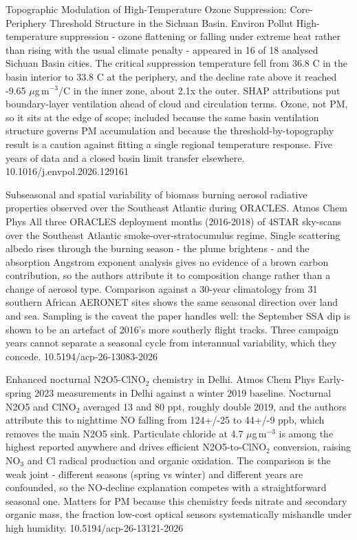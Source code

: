 \documentclass[10pt]{article}
\begin{document}
{Topographic Modulation of High-Temperature Ozone Suppression: Core-Periphery Threshold Structure in the Sichuan Basin.}
{Environ Pollut}
{High-temperature suppression - ozone flattening or falling under extreme heat rather than rising with the usual climate penalty - appeared in 16 of 18 analysed Sichuan Basin cities. The critical suppression temperature fell from 36.8 C in the basin interior to 33.8 C at the periphery, and the decline rate above it reached -9.65 $\mu$g\,m$^{-3}$/C in the inner zone, about 2.1x the outer. SHAP attributions put boundary-layer ventilation ahead of cloud and circulation terms. Ozone, not PM, so it sits at the edge of scope; included because the same basin ventilation structure governs PM accumulation and because the threshold-by-topography result is a caution against fitting a single regional temperature response. Five years of data and a closed basin limit transfer elsewhere.}
{10.1016/j.envpol.2026.129161}

{Subseasonal and spatial variability of biomass burning aerosol radiative properties observed over the Southeast Atlantic during ORACLES.}
{Atmos Chem Phys}
{All three ORACLES deployment months (2016-2018) of 4STAR sky-scans over the Southeast Atlantic smoke-over-stratocumulus regime. Single scattering albedo rises through the burning season - the plume brightens - and the absorption Angstrom exponent analysis gives no evidence of a brown carbon contribution, so the authors attribute it to composition change rather than a change of aerosol type. Comparison against a 30-year climatology from 31 southern African AERONET sites shows the same seasonal direction over land and sea. Sampling is the caveat the paper handles well: the September SSA dip is shown to be an artefact of 2016's more southerly flight tracks. Three campaign years cannot separate a seasonal cycle from interannual variability, which they concede.}
{10.5194/acp-26-13083-2026}

{Enhanced nocturnal N2O5-ClNO$_2$ chemistry in Delhi.}
{Atmos Chem Phys}
{Early-spring 2023 measurements in Delhi against a winter 2019 baseline. Nocturnal N2O5 and ClNO$_2$ averaged 13 and 80 ppt, roughly double 2019, and the authors attribute this to nighttime NO falling from 124+/-25 to 44+/-9 ppb, which removes the main N2O5 sink. Particulate chloride at 4.7 $\mu$g\,m$^{-3}$ is among the highest reported anywhere and drives efficient N2O5-to-ClNO$_2$ conversion, raising NO$_3$ and Cl radical production and organic oxidation. The comparison is the weak joint - different seasons (spring vs winter) and different years are confounded, so the NO-decline explanation competes with a straightforward seasonal one. Matters for PM because this chemistry feeds nitrate and secondary organic mass, the fraction low-cost optical sensors systematically mishandle under high humidity.}
{10.5194/acp-26-13121-2026}
\end{document}
